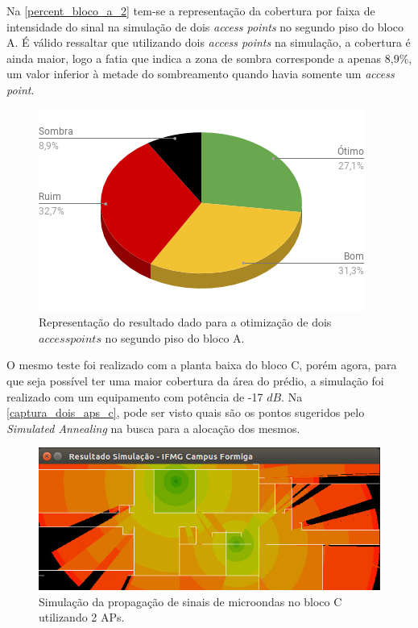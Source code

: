 \documentclass[
	12pt,				%
	twoside,			%
	a4paper,			%
	english,			%
	french,				%
	spanish,			%
	brazil				%
	]{abntex2}
\begin{document}
Na \autoref{percent_bloco_a_2} tem-se a representação da cobertura por
faixa de intensidade do sinal na simulação de dois \emph{access points}
no segundo piso do bloco A. É válido ressaltar que utilizando dois
\emph{access points} na simulação, a cobertura é ainda maior, logo a
fatia que indica a zona de sombra corresponde a apenas 8,9\%, um valor
inferior à metade do sombreamento quando havia somente um \emph{access
point}.

\begin{figure}[ht]
    \caption{\label{percent_bloco_a_2} Representação do resultado dado para a otimização de dois $access points$ no segundo piso do bloco A. }
    \begin{center}
        \includegraphics[scale=0.7]{imagens/percent-bloco-a-2.png}
    \end{center}
\end{figure}

O mesmo teste foi realizado com a planta baixa do bloco C, porém agora,
para que seja possível ter uma maior cobertura da área do prédio, a
simulação foi realizado com um equipamento com potência de -17 \(dB\).
Na \autoref{captura_dois_aps_c}, pode ser visto quais são os pontos
sugeridos pelo \emph{Simulated Annealing} na busca para a alocação dos
mesmos.

\begin{figure}[ht]
    \caption{\label{captura_dois_aps_c} Simulação da propagação de sinais de microondas no bloco C utilizando 2 APs.
    }
    \begin{center}
        \includegraphics[scale=0.7]{imagens/captura-2-aps-bloco-c-2.jpg}
    \end{center}
\end{figure}
\end{document}
